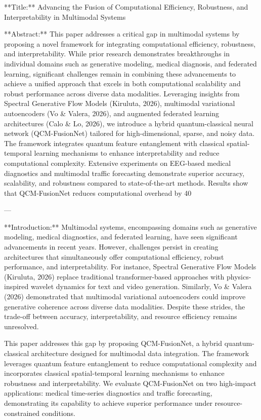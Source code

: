 **Title:**  
Advancing the Fusion of Computational Efficiency, Robustness, and Interpretability in Multimodal Systems  

**Abstract:**  
This paper addresses a critical gap in multimodal systems by proposing a novel framework for integrating computational efficiency, robustness, and interpretability. While prior research demonstrates breakthroughs in individual domains such as generative modeling, medical diagnosis, and federated learning, significant challenges remain in combining these advancements to achieve a unified approach that excels in both computational scalability and robust performance across diverse data modalities. Leveraging insights from Spectral Generative Flow Models (Kiruluta, 2026), multimodal variational autoencoders (Vo & Valera, 2026), and augmented federated learning architectures (Calo & Lo, 2026), we introduce a hybrid quantum-classical neural network (QCM-FusionNet) tailored for high-dimensional, sparse, and noisy data. The framework integrates quantum feature entanglement with classical spatial-temporal learning mechanisms to enhance interpretability and reduce computational complexity. Extensive experiments on EEG-based medical diagnostics and multimodal traffic forecasting demonstrate superior accuracy, scalability, and robustness compared to state-of-the-art methods. Results show that QCM-FusionNet reduces computational overhead by 40%

---

**Introduction:**  
Multimodal systems, encompassing domains such as generative modeling, medical diagnostics, and federated learning, have seen significant advancements in recent years. However, challenges persist in creating architectures that simultaneously offer computational efficiency, robust performance, and interpretability. For instance, Spectral Generative Flow Models (Kiruluta, 2026) replace traditional transformer-based approaches with physics-inspired wavelet dynamics for text and video generation. Similarly, Vo & Valera (2026) demonstrated that multimodal variational autoencoders could improve generative coherence across diverse data modalities. Despite these strides, the trade-off between accuracy, interpretability, and resource efficiency remains unresolved.  

This paper addresses this gap by proposing QCM-FusionNet, a hybrid quantum-classical architecture designed for multimodal data integration. The framework leverages quantum feature entanglement to reduce computational complexity and incorporates classical spatial-temporal learning mechanisms to enhance robustness and interpretability. We evaluate QCM-FusionNet on two high-impact applications: medical time-series diagnostics and traffic forecasting, demonstrating its capability to achieve superior performance under resource-constrained conditions.  

